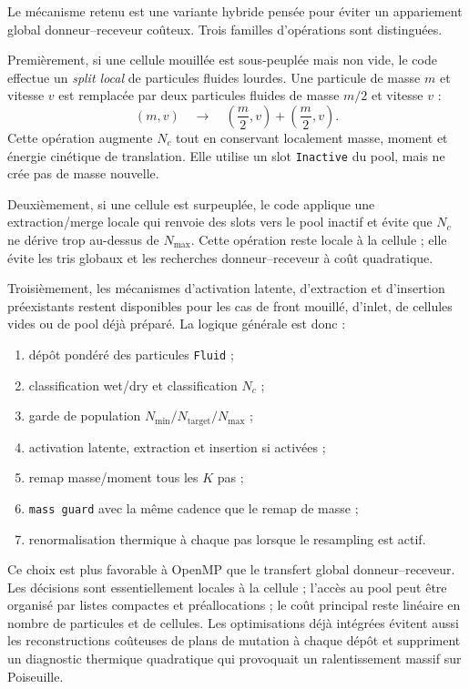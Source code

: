 \documentclass[11pt,a4paper]{article}
\begin{document}
Le mécanisme retenu est une variante hybride pensée pour éviter un appariement global donneur--receveur coûteux. Trois familles d'opérations sont distinguées.

Premièrement, si une cellule mouillée est sous-peuplée mais non vide, le code effectue un \emph{split local} de particules fluides lourdes. Une particule de masse $m$ et vitesse $v$ est remplacée par deux particules fluides de masse $m/2$ et vitesse $v$ :
\begin{equation}
  (m,v)\quad\longrightarrow\quad
  \left(\frac{m}{2},v\right)+
  \left(\frac{m}{2},v\right).
\end{equation}
Cette opération augmente $N_c$ tout en conservant localement masse, moment et énergie cinétique de translation. Elle utilise un slot \texttt{Inactive} du pool, mais ne crée pas de masse nouvelle.

Deuxièmement, si une cellule est surpeuplée, le code applique une extraction/merge locale qui renvoie des slots vers le pool inactif et évite que $N_c$ ne dérive trop au-dessus de $N_{\max}$. Cette opération reste locale à la cellule ; elle évite les tris globaux et les recherches donneur--receveur à coût quadratique.

Troisièmement, les mécanismes d'activation latente, d'extraction et d'insertion préexistants restent disponibles pour les cas de front mouillé, d'inlet, de cellules vides ou de pool déjà préparé. La logique générale est donc :
\begin{enumerate}[label=\arabic*)]
  \item dépôt pondéré des particules \texttt{Fluid} ;
  \item classification wet/dry et classification $N_c$ ;
  \item garde de population $N_{\min}/N_{\mathrm{target}}/N_{\max}$ ;
  \item activation latente, extraction et insertion si activées ;
  \item remap masse/moment tous les $K$ pas ;
  \item \texttt{mass guard} avec la même cadence que le remap de masse ;
  \item renormalisation thermique à chaque pas lorsque le resampling est actif.
\end{enumerate}

Ce choix est plus favorable à OpenMP que le transfert global donneur--receveur. Les décisions sont essentiellement locales à la cellule ; l'accès au pool peut être organisé par listes compactes et préallocations ; le coût principal reste linéaire en nombre de particules et de cellules. Les optimisations déjà intégrées évitent aussi les reconstructions coûteuses de plans de mutation à chaque dépôt et suppriment un diagnostic thermique quadratique qui provoquait un ralentissement massif sur Poiseuille.
\end{document}
